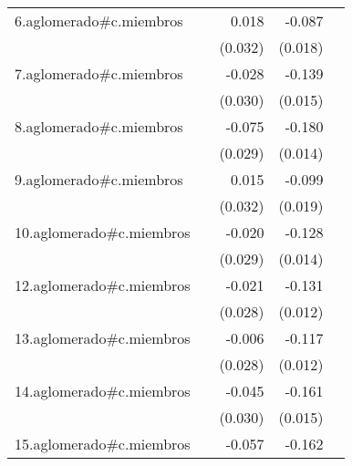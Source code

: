 {\begin{longtable}{l*{4}{D{.}{.}{-1}}}
\addlinespace
6.aglomerado#c.miembros&                     &       0.018         &      -0.087\sym{***}&                     \\
            &                     &     (0.032)         &     (0.018)         &                     \\
\addlinespace
7.aglomerado#c.miembros&                     &      -0.028         &      -0.139\sym{***}&                     \\
            &                     &     (0.030)         &     (0.015)         &                     \\
\addlinespace
8.aglomerado#c.miembros&                     &      -0.075\sym{**} &      -0.180\sym{***}&                     \\
            &                     &     (0.029)         &     (0.014)         &                     \\
\addlinespace
9.aglomerado#c.miembros&                     &       0.015         &      -0.099\sym{***}&                     \\
            &                     &     (0.032)         &     (0.019)         &                     \\
\addlinespace
10.aglomerado#c.miembros&                     &      -0.020         &      -0.128\sym{***}&                     \\
            &                     &     (0.029)         &     (0.014)         &                     \\
\addlinespace
12.aglomerado#c.miembros&                     &      -0.021         &      -0.131\sym{***}&                     \\
            &                     &     (0.028)         &     (0.012)         &                     \\
\addlinespace
13.aglomerado#c.miembros&                     &      -0.006         &      -0.117\sym{***}&                     \\
            &                     &     (0.028)         &     (0.012)         &                     \\
\addlinespace
14.aglomerado#c.miembros&                     &      -0.045         &      -0.161\sym{***}&                     \\
            &                     &     (0.030)         &     (0.015)         &                     \\
\addlinespace
15.aglomerado#c.miembros&                     &      -0.057         &      -0.162\sym{***}&                     \\

\end{longtable}}
